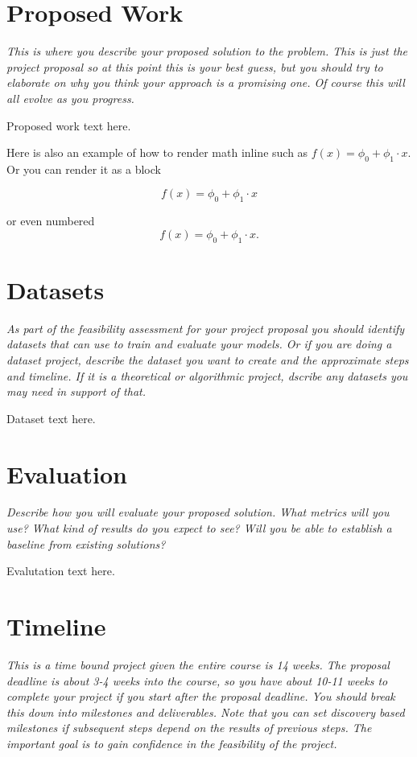 \documentclass[11pt, oneside]{article}   	%
\begin{document}
\section*{Proposed Work}

\textit{This is where you describe your proposed solution to the problem.
This is just the project proposal so at this point this is your best
guess, but you should try to elaborate on why you think your approach is
a promising one. Of course this will all evolve as you progress.}

Proposed work text here. 

Here is also an example of how to render math inline
such as \(f(x) = \phi_0 + \phi_1 \cdot x\). Or you can render it as a block

\[
f(x) = \phi_0 + \phi_1 \cdot x
\]

or even numbered
\begin{equation}
f(x) = \phi_0 + \phi_1 \cdot x.
\end{equation}

\section*{Datasets}

\textit{As part of the feasibility assessment for your project proposal
you should identify datasets that can use to train and evaluate your
models. Or if you are doing a dataset project, describe the dataset you
want to create and the approximate steps and timeline. If it is a theoretical
or algorithmic project, dscribe any datasets you may need in support of
that.}

Dataset text here.

\section*{Evaluation}

\textit{Describe how you will evaluate your proposed solution. What metrics
will you use? What kind of results do you expect to see? Will you be able
to establish a baseline from existing solutions?}

Evalutation text here.

\section*{Timeline}

\textit{This is a time bound project given the entire course is 14 weeks. 
The proposal deadline is about 3-4 weeks into the course, so you have
about 10-11 weeks to complete your project if you start after the proposal
deadline. You should break this down into
milestones and deliverables. Note that you can set discovery based milestones if
subsequent steps depend on the results of previous steps. The important
goal is to gain confidence in the feasibility of the project.}
\end{document}
